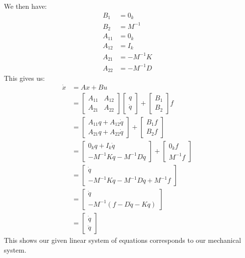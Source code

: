 \documentclass[12pt]{exam}
\begin{document}
\begin{questions}
\begin{solution}
 We then have:
\begin{align*}
  B_1 &= 0_k \\
  B_2 &= M^{-1} \\
  A_{11} &= 0_k \\
  A_{12} &= I_k \\
  A_{21} &= -M^{-1}K \\
  A_{22} &= -M^{-1}D
\end{align*}
This gives us:
\begin{align*}
  \dot{x} &= Ax + Bu  \\
  &= \begin{bmatrix}
      A_{11} & A_{12} \\
      A_{21} & A_{22}
    \end{bmatrix}
    \begin{bmatrix}
      q \\
      \dot{q}
    \end{bmatrix} +
    \begin{bmatrix}
      B_1 \\
      B_2
    \end{bmatrix}f \\
  &=
    \begin{bmatrix}
      A_{11}q + A_{12} \dot{q} \\
      A_{21}q + A_{22} \dot{q} 
    \end{bmatrix} +
    \begin{bmatrix}
      B_1f \\ 
      B_2 f
    \end{bmatrix} \\
  &= \begin{bmatrix}
    0_kq + I_k \dot{q} \\
    -M^{-1}Kq -M^{-1}D \dot{q}
    \end{bmatrix}+ 
    \begin{bmatrix}
      0_kf \\
      M^{-1} f 
    \end{bmatrix} \\
  &= \begin{bmatrix}
    \dot{q} \\
    -M^{-1}Kq -M^{-1}D\dot{q} + M^{-1} f
    \end{bmatrix} \\
  &= \begin{bmatrix}
    \dot{q} \\
    -M^{-1}(f - D\dot{q} - Kq)
    \end{bmatrix} \\
  &= \begin{bmatrix}
    \dot{q} \\
    \ddot{q}
    \end{bmatrix} \tag{As per problem statement}
\end{align*}
This shows our given linear system of equations corresponds to our mechanical system.
\end{solution}


\end{questions}
\end{document}
